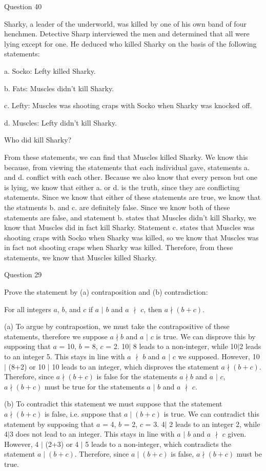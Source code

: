 \documentclass{article}
\begin{document}
\clearpage
{} Question 40
\item[]Sharky, a leader of the underworld, was killed by one of his own band of four henchmen. Detective Sharp interviewed the men and determined that all were lying except for one. He deduced who killed Sharky on the basis of the following statements: 
\item[] a. Socko: Lefty killed Sharky.
\item[] b. Fats: Muscles didn't kill Sharky.
\item[] c. Lefty: Muscles was shooting craps with Socko when Sharky was knocked off.
\item[] d. Muscles: Lefty didn't kill Sharky.
\item[] Who did kill Sharky?
\item[]From these statements, we can find that Muscles killed Sharky. We know this because, from viewing the statements that each individual gave, statements a. and d. conflict with each other. Because we also know that every person but one is lying, we know that either a. or d. is the truth, since they are conflicting statements. Since we know that either of these statements are true, we know that the statments b. and c. are definitely false. Since we know both of these statements are false, and statement b. states that Muscles didn't kill Sharky, we know that Muscles did in fact kill Sharky. Statement c. states that Muscles was shooting craps with Socko when Sharky was killed, so we know that Muscles was in fact not shooting craps when Sharky was killed. Therefore, from these statements, we know that Muscles killed Sharky. 

\clearpage
{} Question 29
\item[] Prove the statement by (a) contraposition and (b) contradiction:
\item[]For all integers $a$, $b$, and $c$ if $a$ $\mid$ $b$ and $a$ $\nmid$ $c$, then $a \nmid (b + c)$.
\item[](a) To argue by contrapostion, we must take the contrapositive of these statements, therefore we suppose $a \nmid b$ and $a$ $\mid$ $c$ is true. We can disprove this by supposing that $a$ = 10, $b$ = 8, $c$ = 2. 10$\mid$ 8 leads to a non-integer, while 10$\mid$2 leads to an integer 5. This stays in line with  $a$ $\nmid$ $b$ and $a$ $\mid$ $c$ we supposed. However, 10 $\mid$ (8+2) or 10 $\mid$ 10 leads to an integer, which disproves the statement $a \nmid (b + c)$. Therefore, since $a \nmid (b + c)$ is false for the statements $a \nmid b$ and $a$ $\mid$ $c$, $a \nmid (b + c)$ must be true for the statements $a$ $\mid$ $b$ and $a$ $\nmid$ $c$.
\item[](b) To contradict this statement we must suppose that the statement $a \nmid (b + c)$ is false, i.e. suppose that $a \mid (b + c)$ is true. We can contradict this statement by supposing that $a$ = 4, $b$ = 2, $c$ = 3. 4$\mid$ 2 leads to an integer 2, while 4$\mid$3 does not lead to an integer. This stays in line with  $a$ $\mid$ $b$ and $a$ $\nmid$ $c$ given. However, 4 $\mid$ (2+3) or 4 $\mid$ 5 leads to a non-integer, which contradicts the statement $a \mid (b + c)$. Therefore, since $a \mid (b + c)$ is false, $a \nmid (b + c)$ must be true.
\end{document}
